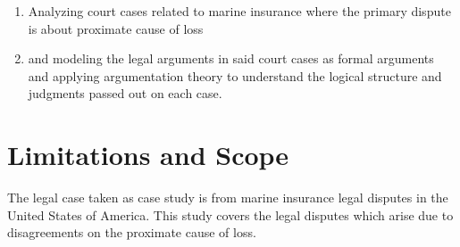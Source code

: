 \begin{enumerate}
    \item Analyzing court cases related to marine insurance where the primary dispute is about proximate cause of loss
    \item and modeling the legal arguments in said court cases as formal arguments and applying argumentation theory to understand the logical structure and judgments passed out on each case.
\end{enumerate}
  

\section{Limitations and Scope}

The legal case taken as case study is from marine insurance legal disputes in the United States of America. This study covers the legal disputes which arise due to disagreements on the proximate cause of loss.

\FloatBarrier
